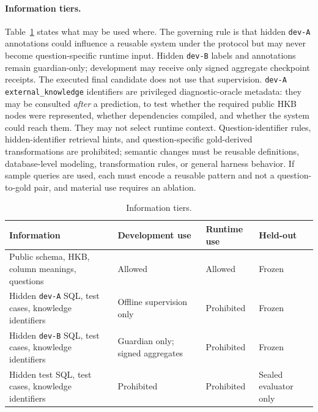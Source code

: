 \paragraph{Information tiers.}
Table~\ref{tab:tiers} states what may be used where. The governing rule is that
hidden \texttt{dev-A} annotations could influence a reusable system under the
protocol but may never become question-specific runtime input. Hidden
\texttt{dev-B} labels and annotations remain guardian-only; development may
receive only signed aggregate checkpoint receipts. The executed final
candidate does not use that supervision. \texttt{dev-A}
\texttt{external\_knowledge} identifiers are privileged diagnostic-oracle
metadata: they may be consulted \emph{after} a prediction, to test whether the
required public HKB nodes were represented, whether dependencies compiled, and
whether the system could reach them. They may not select runtime context.
Question-identifier rules, hidden-identifier retrieval hints, and
question-specific gold-derived transformations are prohibited; semantic changes
must be reusable definitions, database-level modeling, transformation rules, or
general harness behavior. If sample queries are used, each must encode a reusable
pattern and not a question-to-gold pair, and material use requires an
ablation.

\begin{table}[htbp]
\centering
\caption{Information tiers.}
\label{tab:tiers}
\begin{tabular}{p{5.1cm}p{2.6cm}p{2.1cm}p{2.4cm}}
\toprule
Information & Development use & Runtime use & Held-out \\
\midrule
Public schema, HKB, column meanings, questions & Allowed & Allowed & Frozen \\
Hidden \texttt{dev-A} SQL, test cases, knowledge identifiers & Offline supervision only & Prohibited & Frozen \\
Hidden \texttt{dev-B} SQL, test cases, knowledge identifiers & Guardian only; signed aggregates & Prohibited & Frozen \\
Hidden test SQL, test cases, knowledge identifiers & Prohibited & Prohibited & Sealed evaluator only \\
\bottomrule
\end{tabular}
\end{table}

